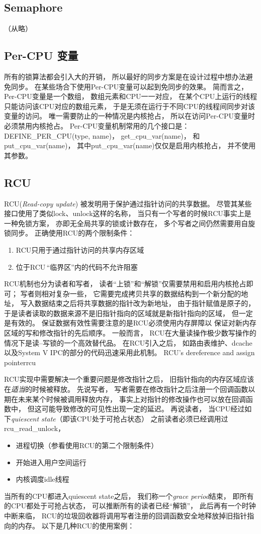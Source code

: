 \documentclass[11pt]{article}
\begin{document}
\subsection{Semaphore}
（从略）
\subsection{Per-CPU 变量}
所有的锁算法都会引入大的开销，
所以最好的同步方案是在设计过程中想办法避免同步。
在某些场合下使用Per-CPU变量可以起到免同步的效果。
简而言之，
Per-CPU变量是一个数组，
数组元素和CPU一一对应，
在某个CPU上运行的线程只能访问该CPU对应的数组元素，
于是无须在运行于不同CPU的线程间同步对该变量的访问。
唯一需要防止的一种情况是内核抢占，
所以在访问Per-CPU变量时必须禁用内核抢占。
Per-CPU变量机制常用的几个接口是：
DEFINE\_PER\_CPU(type, name)，
get\_cpu\_var(name)，
和put\_cpu\_var(name)，
其中put\_cpu\_var(name)仅仅是启用内核抢占，
并不使用其参数。

\subsection{RCU}
RCU({\em Read-copy update})%
被发明用于保护通过指针访问的共享数据。
尽管其某些接口使用了类似lock、unlock这样的名称，
当只有一个写者的时候RCU事实上是一种免锁方案，
亦即无全局共享的锁或计数存在，
多个写者之间仍然需要用自旋锁同步。
正确使用RCU的两个限制条件：
\begin{enumerate}
  \item RCU只用于通过指针访问的共享内存区域
  \item 位于RCU\,``临界区''内的代码不允许阻塞
\end{enumerate}

RCU机制也分为读者和写者，
读者``上锁''和``解锁''仅需要禁用和启用内核抢占即可；
写者则相对复杂一些，
它需要完成拷贝共享的数据结构到一个新分配的地址，
写入数据结束之后将共享数据的指针改为新地址，
由于指针赋值是原子的，
于是读者读取的数据来源不是旧指针指向的区域就是新指针指向的区域，
但一定是有效的。
保证数据有效性需要注意的是RCU必须使用内存屏障以%
保证对新内存区域的写和修改指针的先后顺序。
一般而言，
RCU在大量读操作极少数写操作的情况下是读--写锁的一个高效替代品。
在RCU引入之后，
如路由表维护、dcache以及System V IPC的部分的代码迅速采用此机制。
              {RCU's dereference and assign pointer}{rcu}

RCU实现中需要解决一个重要问题是修改指针之后，
旧指针指向的内存区域应该在{\em 适当}的时候被释放。
先说写者，
写者需要在修改指针之后注册一个回调函数以期在未来某个时候被调用释放内存，
事实上对指针的修改操作也可以放在回调函数中，
但这可能导致修改的可见性出现一定的延迟。
再说读者，
当CPU经过如下{\em quiescent state}（即该CPU处于可抢占状态）%
之前读者必须已经调用过rcu\_read\_unlock，
\begin{itemize}
  \item 进程切换（参看使用RCU的第二个限制条件）
  \item 开始进入用户空间运行
  \item 内核调度idle线程
\end{itemize}
当所有的CPU都进入quiescent state之后，
我们称一个{\em grace period}结束，
即所有的CPU都处于可抢占状态，
可以推断所有的读者已经``解锁''，
此后再有一个时钟中断来临，
RCU的垃圾回收器将调用写者注册的回调函数安全地释放掉旧指针指向的内存。
以下是几种RCU的使用案例：
\end{document}
